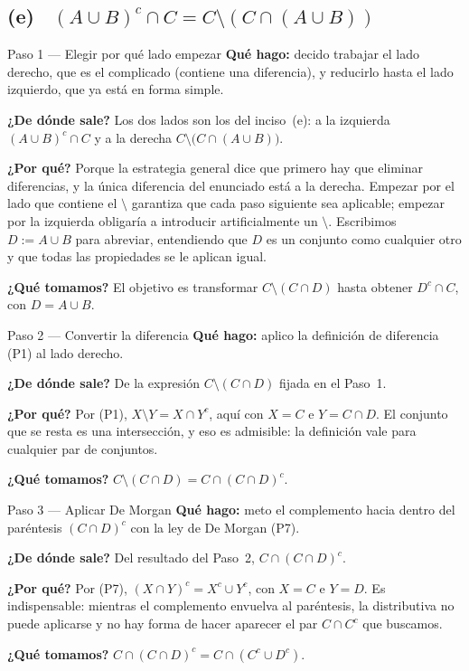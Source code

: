 \documentclass[11pt]{article}
\begin{document}
\subsection*{(e) \ $(A\cup B)^{c}\cap C=C\setminus(C\cap(A\cup B))$}

\begin{paso}{Paso 1 --- Elegir por qué lado empezar}
\textbf{Qué hago:} decido trabajar el lado derecho, que es el complicado (contiene una
diferencia), y reducirlo hasta el lado izquierdo, que ya está en forma simple.

\textbf{¿De dónde sale?} Los dos lados son los del inciso~(e): a la izquierda
$(A\cup B)^{c}\cap C$ y a la derecha $C\setminus\bigl(C\cap(A\cup B)\bigr)$.

\textbf{¿Por qué?} Porque la estrategia general dice que primero hay que eliminar diferencias, y
la única diferencia del enunciado está a la derecha. Empezar por el lado que contiene el
$\setminus$ garantiza que cada paso siguiente sea aplicable; empezar por la izquierda obligaría
a introducir artificialmente un $\setminus$. Escribimos $D:=A\cup B$ para abreviar, entendiendo
que $D$ es un conjunto como cualquier otro y que todas las propiedades se le aplican igual.

\textbf{¿Qué tomamos?} El objetivo es transformar $C\setminus(C\cap D)$ hasta obtener
$D^{c}\cap C$, con $D=A\cup B$.
\end{paso}

\begin{paso}{Paso 2 --- Convertir la diferencia}
\textbf{Qué hago:} aplico la definición de diferencia (P1) al lado derecho.

\textbf{¿De dónde sale?} De la expresión $C\setminus(C\cap D)$ fijada en el Paso~1.

\textbf{¿Por qué?} Por (P1), $X\setminus Y=X\cap Y^{c}$, aquí con $X=C$ e $Y=C\cap D$. El
conjunto que se resta es una intersección, y eso es admisible: la definición vale para cualquier
par de conjuntos.

\textbf{¿Qué tomamos?} $C\setminus(C\cap D)=C\cap(C\cap D)^{c}$.
\end{paso}

\begin{paso}{Paso 3 --- Aplicar De Morgan}
\textbf{Qué hago:} meto el complemento hacia dentro del paréntesis $(C\cap D)^{c}$ con la ley de
De Morgan (P7).

\textbf{¿De dónde sale?} Del resultado del Paso~2, $C\cap(C\cap D)^{c}$.

\textbf{¿Por qué?} Por (P7), $(X\cap Y)^{c}=X^{c}\cup Y^{c}$, con $X=C$ e $Y=D$. Es
indispensable: mientras el complemento envuelva al paréntesis, la distributiva no puede
aplicarse y no hay forma de hacer aparecer el par $C\cap C^{c}$ que buscamos.

\textbf{¿Qué tomamos?} $C\cap(C\cap D)^{c}=C\cap(C^{c}\cup D^{c})$.
\end{paso}
\end{document}
